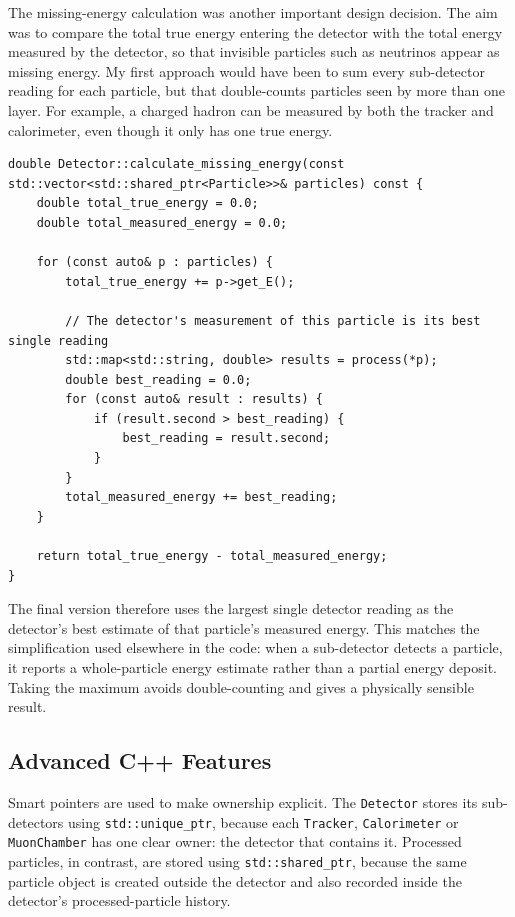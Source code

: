 \documentclass[11pt,a4paper]{article}
\begin{document}
The missing-energy calculation was another important design decision. The aim was to compare the total true energy entering the detector with the total energy measured by the detector, so that invisible particles such as neutrinos appear as missing energy. My first approach would have been to sum every sub-detector reading for each particle, but that double-counts particles seen by more than one layer. For example, a charged hadron can be measured by both the tracker and calorimeter, even though it only has one true energy.

\begin{lstlisting}[caption={Using the largest single detector reading to avoid double-counting.}, label={lst:missingenergy}]
double Detector::calculate_missing_energy(const std::vector<std::shared_ptr<Particle>>& particles) const {
    double total_true_energy = 0.0;
    double total_measured_energy = 0.0;

    for (const auto& p : particles) {
        total_true_energy += p->get_E();

        // The detector's measurement of this particle is its best single reading
        std::map<std::string, double> results = process(*p);
        double best_reading = 0.0;
        for (const auto& result : results) {
            if (result.second > best_reading) {
                best_reading = result.second;
            }
        }
        total_measured_energy += best_reading;
    }

    return total_true_energy - total_measured_energy;
}
\end{lstlisting}

The final version therefore uses the largest single detector reading as the detector's best estimate of that particle's measured energy. This matches the simplification used elsewhere in the code: when a sub-detector detects a particle, it reports a whole-particle energy estimate rather than a partial energy deposit. Taking the maximum avoids double-counting and gives a physically sensible result.

\subsection{Advanced C++ Features}

Smart pointers are used to make ownership explicit. The \texttt{Detector} stores its sub-detectors using \texttt{std::unique\_ptr}, because each \texttt{Tracker}, \texttt{Calorimeter} or \texttt{MuonChamber} has one clear owner: the detector that contains it. Processed particles, in contrast, are stored using \texttt{std::shared\_ptr}, because the same particle object is created outside the detector and also recorded inside the detector's processed-particle history.
\end{document}
